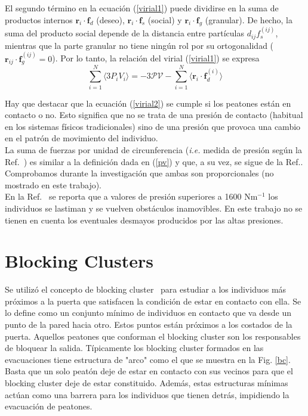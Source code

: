El segundo término en la ecuación (\ref{virial1}) puede dividirse en la suma de productos internos $\mathbf{r}_i\cdot\mathbf{f}_d$ (deseo), 
$\mathbf{r}_i\cdot\mathbf{f}_s$ (social) y $\mathbf{r}_i\cdot\mathbf{f}_g$ (granular). De hecho, la suma del producto social depende de la distancia entre partículas $d_{ij}f_s^{(ij)}$, mientras que la parte granular no tiene ningún rol por su ortogonalidad ($\mathbf{r}_{ij}\cdot\mathbf{f}_g^{(ij)}=0$). Por lo tanto, la relación del virial (\ref{virial1}) se expresa \\  

\begin{equation}
 \displaystyle\sum_{i=1}^N\langle3P_iV_i 
\rangle=-3\mathcal{PV} -\displaystyle\sum_{i=1}^N \langle
\mathbf{r}_i\cdot\mathbf{f}_d^{(i)}\rangle\label{virial2}
\end{equation}

Hay que destacar que la ecuación (\ref{virial2}) se cumple si los peatones están en contacto o no. Esto significa que no se trata de una presión de contacto (habitual en los sistemas físicos tradicionales) sino de una presión que provoca una cambio en el patrón de movimiento del individuo.\\

La suma de fuerzas por unidad de circunferencia (\textit{i.e.} medida de presión según la Ref.~\cite{Helbing1}) es similar a la definición dada en (\ref{pv}) y que, a su vez, se sigue de la Ref.\cite{lion}. Comprobamos durante la investigación que ambas son proporcionales (no mostrado en este trabajo).\\   

En la Ref.~\cite{Helbing1} se reporta que a valores de presión superiores a 1600 Nm$^{-1}$ los individuos se lastiman y se vuelven obstáculos inamovibles. En este trabajo no se tienen en cuenta los eventuales desmayos producidos por las altas presiones. 

\section{Blocking Clusters}

Se utilizó el concepto de blocking cluster~\cite{Dorso1} para estudiar a los individuos más próximos a la puerta que satisfacen la condición de estar en contacto con ella.
Se lo define como un conjunto mínimo de individuos en contacto que va desde un punto de la pared hacia otro. Estos puntos están próximos a los costados de la puerta. Aquellos peatones que conforman el blocking cluster son los responsables de bloquear la salida. Típicamente los blocking cluster formados en las evacuaciones tiene estructura de "arco" como el que se muestra en la Fig. \ref{bc}. Basta que un solo peatón deje de estar en contacto con sus vecinos para que el blocking cluster deje de estar constituido. Además, estas estructuras mínimas actúan como una barrera para los individuos que tienen detrás, impidiendo la evacuación de peatones. \\

